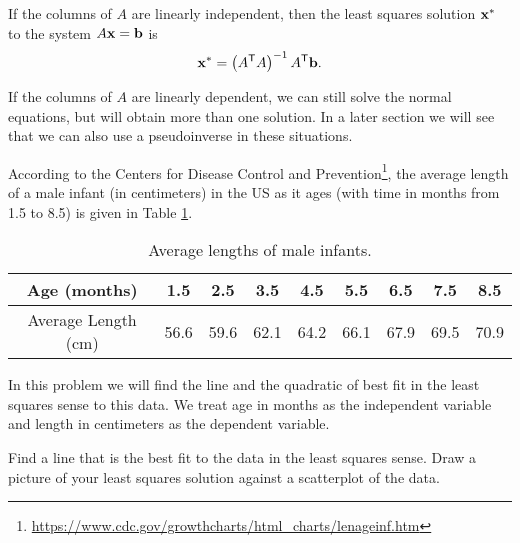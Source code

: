 \begin{theorem} \label{thm:6_f_least_squares_2} If the columns of $A$ are linearly independent, then the least squares solution $\mathbf{x}^*$ to the system $A \mathbf{x} = \mathbf{b}$ is
\[\mathbf{x}^* = \left(A^{\mathsf{T}}A\right)^{-1}A^{\mathsf{T}}\mathbf{b}.\]
\end{theorem}

If the columns of $A$ are linearly dependent, we can still solve the normal equations, but will obtain more than one solution. In a later section we will see that we can also use a pseudoinverse in these situations. 

\label{sec:ls_exam}

\ExampleIntro

\begin{example} According to the Centers for Disease Control and Prevention\footnote{ \url{https://www.cdc.gov/growthcharts/html_charts/lenageinf.htm}}, the average length of a male infant (in centimeters) in the US as it ages (with time in months from 1.5 to 8.5) is given in Table \ref{T:lengths}. 
\begin{table}[h]
\begin{center}
\begin{tabular}{|c||c|c|c|c|c|c|c|c|} \hline
Age (months)	&1.5	&2.5	&3.5	&4.5	&5.5	&6.5	&7.5	&8.5 \\ \hline
Average Length (cm)	&56.6&59.6&62.1&64.2&66.1&67.9&69.5&70.9 \\ \hline
\end{tabular}
\caption{Average lengths of male infants.}
\label{T:lengths}
\end{center}
\end{table}
In this problem we will find the line and the quadratic of best fit in the least squares sense to this data. We treat age in months as the independent variable and length in centimeters as the dependent variable. 
	\ba
	\item Find a line that is the best fit to the data in the least squares sense. Draw a picture of your least squares solution against a scatterplot of the data. 



\end{example}
